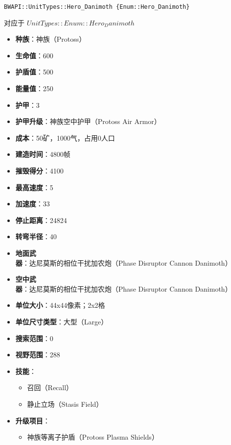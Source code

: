 \begin{tcolorbox}[colback=white, colframe=black!60!white, title=Hero\_Danimoth(), arc=0mm]
    \begin{verbatim}
BWAPI::UnitTypes::Hero_Danimoth {Enum::Hero_Danimoth}
    \end{verbatim}
    对应于  $ UnitTypes::Enum::Hero_Danimoth $ 
    \begin{itemize}
        \item \textbf{种族}：神族（Protoss）
        \item \textbf{生命值}：600
        \item \textbf{护盾值}：500
        \item \textbf{能量值}：250
        \item \textbf{护甲}：3
        \item \textbf{护甲升级}：神族空中护甲（Protoss Air Armor）
        \item \textbf{成本}：50矿，1000气，占用0人口
        \item \textbf{建造时间}：4800帧
        \item \textbf{摧毁得分}：4100
        \item \textbf{最高速度}：5
        \item \textbf{加速度}：33
        \item \textbf{停止距离}：24824
        \item \textbf{转弯半径}：40
        \item \textbf{地面武器}：达尼莫斯的相位干扰加农炮（Phase Disruptor Cannon Danimoth）
        \item \textbf{空中武器}：达尼莫斯的相位干扰加农炮（Phase Disruptor Cannon Danimoth）
        \item \textbf{单位大小}：44x44像素；2x2格
        \item \textbf{单位尺寸类型}：大型（Large）
        \item \textbf{搜索范围}：0
        \item \textbf{视野范围}：288
        \item \textbf{技能}：
            \begin{itemize}
                \item 召回（Recall）
                \item 静止立场（Stasis Field）
            \end{itemize}
        \item \textbf{升级项目}：
            \begin{itemize}
                \item 神族等离子护盾（Protoss Plasma Shields）

\end{itemize}
\end{itemize}
\end{tcolorbox}
